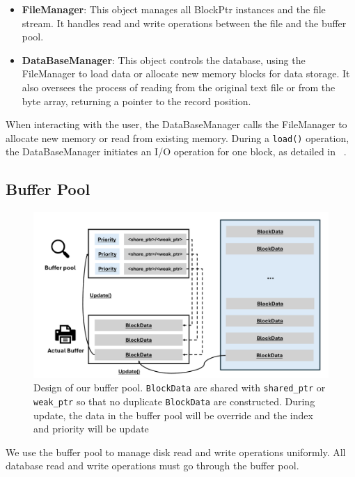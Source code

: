\begin{itemize} 
    \item \textbf{FileManager}: This object manages all BlockPtr instances and the file stream. It handles read and write operations between the file and the buffer pool. 
    \item \textbf{DataBaseManager}: This object controls the database, using the FileManager to load data or allocate new memory blocks for data storage. It also oversees the process of reading from the original text file or from the byte array, returning a pointer to the record position. 
\end{itemize}

When interacting with the user, the DataBaseManager calls the FileManager to allocate new memory or read from existing memory. During a \texttt{load()} operation, the DataBaseManager initiates an I/O operation for one block, as detailed in ~.

\subsection{Buffer Pool}
\label{subsec:io-control}

\begin{figure}[ht]
    \centering
    \includegraphics[width=1\linewidth]{figures/Buffer_pool.pdf}
    \caption{Design of our buffer pool. \texttt{BlockData} are shared with \texttt{shared\_ptr} or \texttt{weak\_ptr} so that no duplicate \texttt{BlockData} are constructed. During update, the data in the buffer pool will be override and the index and priority will be update}
    \label{fig:buffer-pool}
\end{figure}

We use the buffer pool to manage disk read and write operations uniformly. All database read and write operations must go through the buffer pool.

